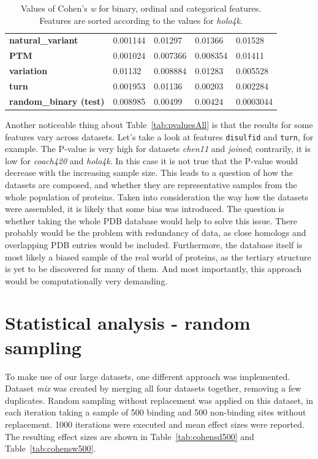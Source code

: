 \begin{table}[]
\begin{tabular}{@{}lllll@{}}
\textbf{natural\_variant}     & 0.001144        & 0.01297           & 0.01366         & 0.01528         \\
\textbf{PTM}                  & 0.001024        & 0.007366          & 0.008354        & 0.01411         \\
\textbf{variation}            & 0.01132         & 0.008884          & 0.01283         & 0.005528        \\
\textbf{turn}                 & 0.001953        & 0.01136           & 0.00203         & 0.002284        \\
\textbf{random\_binary (test)}       & 0.008985        & 0.00499           & 0.00424         & 0.0003044       \\ \bottomrule
\end{tabular}
\caption[Values of Cohen's \textit{w}]{Values of Cohen's \textit{w} for binary, ordinal and categorical features. Features are sorted according to the values for \textit{holo4k}.}
\label{tab:cohensw}
\end{table}

Another noticeable thing about Table~\ref{tab:pvaluesAll} is that the results for some features vary across datasets. Let's take a look at features \texttt{disulfid} and \texttt{turn}, for example. The P-value is very high for datasets \textit{chen11} and \textit{joined}; contrarily, it is low for \textit{coach420} and \textit{holo4k}. In this case it is not true that the P-value would decrease with the increasing sample size. This leads to a question of how the datasets are composed, and whether they are representative samples from the whole population of proteins. Taken into consideration the way how the datasets were assembled, it is likely that some bias was introduced. The question is whether taking the whole PDB database would help to solve this issue. There probably would be the problem with redundancy of data, as close homologs and overlapping PDB entries would be included. Furthermore, the database itself is most likely a biased sample of the real world of proteins, as the tertiary structure is yet to be discovered for many of them. And most importantly, this approach would be computationally very demanding.


\section{Statistical analysis - random sampling}

To make use of our large datasets, one different approach was implemented. Dataset \textit{mix} was created by merging all four datasets together, removing a few duplicates. Random sampling without replacement was applied on this dataset, in each iteration taking a sample of 500 binding and 500 non-binding sites without replacement. 1000 iterations were executed and mean effect sizes were reported. The resulting effect sizes are shown in Table~\ref{tab:cohensd500} and Table~\ref{tab:cohensw500}.

